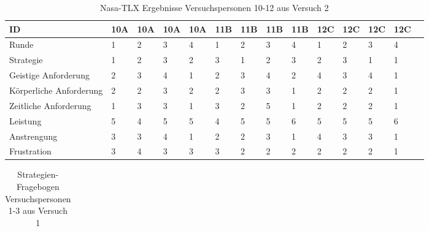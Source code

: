 \documentclass[12pt,a4paper]{scrartcl}
\begin{document}
\begin{appendix}
\begin{table}
\bigskip\bigskip  %
\caption{Nasa-TLX Ergebnisse Versuchspersonen 10-12 aus Versuch 2}

\smallskip
\begin{tabular}{|p{6cm}| p{0.8cm} | p{0.8cm} | p{0.8cm} | p{0.8cm} || p{0.8cm} | p{0.8cm} | p{0.8cm} | p{0.8cm} || p{0.8cm} | p{0.8cm} | p{0.8cm} | p{0.8cm} | p{} | }
\hline
	ID & 10A & 10A & 10A & 10A & 11B & 11B & 11B & 11B & 12C & 12C & 12C & 12C \\ \hline \hline
	Runde & 1 & 2 & 3 & 4 & 1 & 2 & 3 & 4 & 1 & 2 & 3 & 4 \\ \hline
	Strategie & 1 & 2 & 3 & 2 & 3 & 1 & 2 & 3 & 2 & 3 & 1 & 1 \\ \hline \hline
	Geistige Anforderung & 2 & 3 & 4 & 1 & 2 & 3 & 4 & 2 & 4 & 3 & 4 & 1 \\ \hline
	Körperliche Anforderung & 2 & 2 & 3 & 2 & 2 & 3 & 3 & 1 & 2 & 2 & 2 & 1 \\ \hline
	Zeitliche Anforderung & 1 & 3 & 3 & 1 & 3 & 2 & 5 & 1 & 2 & 2 & 2 & 1 \\ \hline
	Leistung & 5 & 4 & 5 & 5 & 4 & 5 & 5 & 6 & 5 & 5 & 5 & 6 \\ \hline
	Anstrengung & 3 & 3 & 4 & 1 & 2 & 2 & 3 & 1 & 4 & 3 & 3 & 1 \\ \hline
	Frustration & 3 & 4 & 3 & 3 & 3 & 2 & 2 & 2 & 2 & 2 & 2 & 1 \\ \hline
\end{tabular}
\end{table}


\begin{table}
\caption{Strategien-Fragebogen Versuchspersonen 1-3 aus Versuch 1}
\begin{tabular}{|p{6cm}| p{0.8cm} | p{0.8cm} | p{0.8cm} | p{0.8cm} || p{0.8cm} | p{0.8cm} | p{0.8cm} | p{0.8cm} || p{0.8cm} | p{0.8cm} | p{0.8cm} | p{0.8cm} | p{} | }
\hline


\end{tabular}
\end{table}
\end{appendix}
\end{document}
